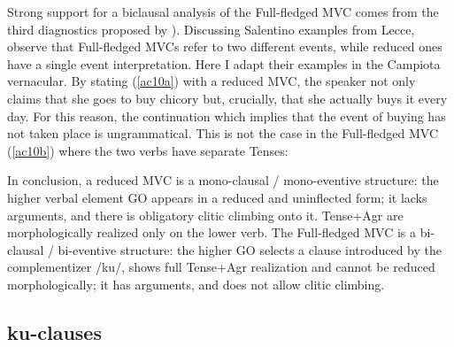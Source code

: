 \documentclass[output=paper]{langscibook}
\begin{document}
Strong support for a biclausal analysis of the Full-fledged MVC comes from the third diagnostics proposed by \cite{cardinaletti2001a, cardinaletti2019a}). Discussing Salentino examples from Lecce, \cite{cardinaletti2019a} observe that Full-fledged MVCs refer to two different events, while reduced ones have a single event interpretation. Here I adapt their examples in the Campiota vernacular.  By stating (\ref{ac10a}) with a reduced MVC, the speaker not only claims that she goes to buy chicory but, crucially, that she actually buys it every day. For this reason, the continuation which implies that the event of buying has not taken place is ungrammatical. This is not the case in the Full-fledged MVC (\ref{ac10b}) where the two verbs have separate Tenses:

\ea \label{ac10}
    \z
\z

In conclusion, a reduced MVC is a mono-clausal / mono-eventive structure: the higher verbal element GO appears in a reduced and uninflected form; it lacks arguments, and there is obligatory clitic climbing onto it.   Tense+Agr are morphologically realized only on the lower verb.  The Full-fledged MVC is a bi-clausal / bi-eventive structure: the higher GO selects a clause introduced by the complementizer /ku/, shows full Tense+Agr realization and cannot be reduced morphologically; it has arguments, and does not allow clitic climbing. 

\subsection{ku-clauses}
\end{document}
